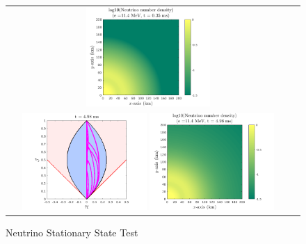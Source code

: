 \begin{figure}[h]
\begin{tabular}{cc}
    \includegraphics[width=0.45\textwidth]{figures/NSS_3_2} \\
    \includegraphics[width=0.45\textwidth]{figures/NSS_5_1}
    \includegraphics[width=0.45\textwidth]{figures/NSS_5_2} \\
  \end{tabular}
   \caption{Neutrino Stationary State Test}
\end{figure}